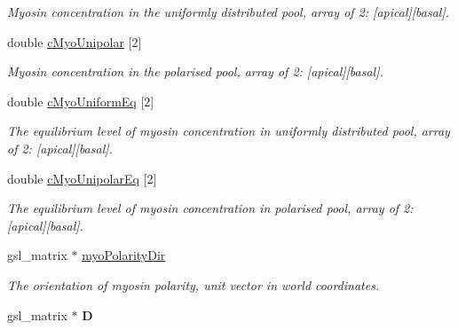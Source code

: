 \begin{DoxyCompactItemize}
\begin{DoxyCompactList}\small\item\em Myosin concentration in the uniformly distributed pool, array of 2\+: \mbox{[}apical\mbox{]}\mbox{[}basal\mbox{]}. \end{DoxyCompactList}\item 
\hypertarget{classShapeBase_a2a1e584564ef617fa1d18eb591c84a67}{}double \hyperlink{classShapeBase_a2a1e584564ef617fa1d18eb591c84a67}{c\+Myo\+Unipolar} \mbox{[}2\mbox{]}\label{classShapeBase_a2a1e584564ef617fa1d18eb591c84a67}

\begin{DoxyCompactList}\small\item\em Myosin concentration in the polarised pool, array of 2\+: \mbox{[}apical\mbox{]}\mbox{[}basal\mbox{]}. \end{DoxyCompactList}\item 
\hypertarget{classShapeBase_aa32b4675de014e09732e7ab89719e679}{}double \hyperlink{classShapeBase_aa32b4675de014e09732e7ab89719e679}{c\+Myo\+Uniform\+Eq} \mbox{[}2\mbox{]}\label{classShapeBase_aa32b4675de014e09732e7ab89719e679}

\begin{DoxyCompactList}\small\item\em The equilibrium level of myosin concentration in uniformly distributed pool, array of 2\+: \mbox{[}apical\mbox{]}\mbox{[}basal\mbox{]}. \end{DoxyCompactList}\item 
\hypertarget{classShapeBase_a59c3af9d1dcfe4749d33ba168c5bda53}{}double \hyperlink{classShapeBase_a59c3af9d1dcfe4749d33ba168c5bda53}{c\+Myo\+Unipolar\+Eq} \mbox{[}2\mbox{]}\label{classShapeBase_a59c3af9d1dcfe4749d33ba168c5bda53}

\begin{DoxyCompactList}\small\item\em The equilibrium level of myosin concentration in polarised pool, array of 2\+: \mbox{[}apical\mbox{]}\mbox{[}basal\mbox{]}. \end{DoxyCompactList}\item 
\hypertarget{classShapeBase_afc91612adf1d146a48767756f38d1152}{}gsl\+\_\+matrix $\ast$ \hyperlink{classShapeBase_afc91612adf1d146a48767756f38d1152}{myo\+Polarity\+Dir}\label{classShapeBase_afc91612adf1d146a48767756f38d1152}

\begin{DoxyCompactList}\small\item\em The orientation of myosin polarity, unit vector in world coordinates. \end{DoxyCompactList}\item 
\hypertarget{classShapeBase_a1878efccfc629e53748e8907386825b0}{}gsl\+\_\+matrix $\ast$ {\bfseries D}\label{classShapeBase_a1878efccfc629e53748e8907386825b0}


\end{DoxyCompactItemize}

